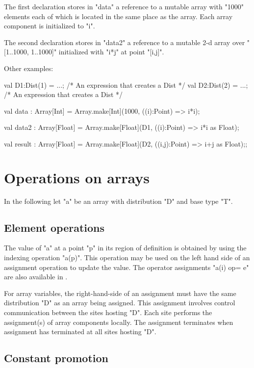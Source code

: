 {}\noindent 
The first declaration stores in \xcd"data" a reference to a mutable
array with \xcd"1000" elements each of which is located in the
same place as the array. Each array component is initialized to \xcd"i".

The second declaration stores in \xcd"data2" a reference to a mutable
2-d array over \xcd"[1..1000, 1..1000]" initialized with \xcd"i*j"
at point \xcd"[i,j]".

Other examples:
\begin{xten}
val D1:Dist(1) = ...; /* An expression that creates a Dist */
val D2:Dist(2) = ...; /* An expression that creates a Dist */

val data : Array[Int]
    = Array.make[Int](1000, ((i):Point) => i*i);

val data2 : Array[Float]
    = Array.make[Float](D1, ((i):Point) => i*i as Float);

val result : Array[Float]
   = Array.make[Float](D2, ((i,j):Point) => i+j as Float);;
\end{xten}

\section{Operations on arrays}
In the following let \xcd"a" be an array with distribution \xcd"D" and
base type \xcd"T". 

\subsection{Element operations}
The value of \xcd"a" at a point \xcd"p" in its region of definition is
obtained by using the indexing operation \xcd"a(p)". This operation
may be used on the left hand side of an assignment operation to update
the value. The operator assignments \xcd"a(i) op= e" are also available
in \Xten{}.

For array variables, the right-hand-side of an assignment must
have the same distribution \xcd"D" as an array being assigned. This
assignment involves
control communication between the sites hosting \xcd"D". Each
site performs the assignment(s) of array components locally. The
assignment terminates when assignment has terminated at all
sites hosting \xcd"D".

\subsection{Constant promotion}\label{ConstantArray}

